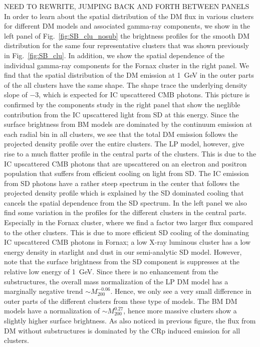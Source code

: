 \documentclass[10pt,aps,pra,reprint,amsmath,amsfonts,amssymb,showpacs]{revtex4-1}
\newcommand{\mvir}{M_{200}}
\begin{document}
NEED TO REWRITE, JUMPING BACK AND FORTH BETWEEN PANELS In order to
learn about the spatial distribution of the DM flux in various
clusters for different DM models and associated gamma-ray components,
we show in the left panel of Fig.~\ref{fig:SB_clu_nosub} the
brightness profiles for the smooth DM distribution for the same four
representative clusters that was shown previously in
Fig.~\ref{fig:SB_clu}. In addition, we show the spatial dependence of
the individual gamma-ray components for the Fornax cluster in the
right panel. We find that the spatial distribution of the DM emission
at 1~GeV in the outer parts of the all clusters have the same
shape. The shape trace the underlying density slope of $-3$, which is
expected for IC upscattered CMB photons. This picture is confirmed by
the components study in the right panel that show the neglible
contribution from the IC upscattered light from SD at this
energy. Since the surface brightness from BM models are dominated by
the continuum emission at each radial bin in all clusters, we see that
the total DM emission follows the projected density profile over the
entire clusters. The LP model, however, give rise to a much flatter
profile in the central parts of the clusters. This is due to the IC
upscattered CMB photons that are upscattered on an electron and
positron population that suffers from efficient cooling on light from
SD. The IC emission from SD photons have a rather steep spectrum in
the center that follows the projected density profile which is
explained by the SD dominated cooling that cancels the spatial
dependence from the SD spectrum. In the left panel we also find some
variation in the profiles for the different clusters in the central
parts. Especially in the Fornax cluster, where we find a factor two
larger flux compared to the other clusters. This is due to more
efficient SD cooling of the dominating IC upscattered CMB photons in
Fornax; a low X-ray luminous cluster has a low energy density in
starlight and dust in our semi-analytic SD model. However, note that
the surface brightness from the SD component is suppresses at the
relative low energy of 1~GeV.  Since there is no enhancement from the
substructures, the overall mass normalization of the LP DM model has a
marginally negative trend $\sim\mvir^{-0.06}$. Hence, we only see a
very small difference in outer parts of the different clusters from
these type of models. The BM DM models have a normalization of
$\sim\mvir^{0.27}$, hence more massive clusters show a slightly higher
surface brightness. As also noticed in previous figure, the flux from
DM without substructures is dominated by the CRp induced emission for
all clusters.
\end{document}
